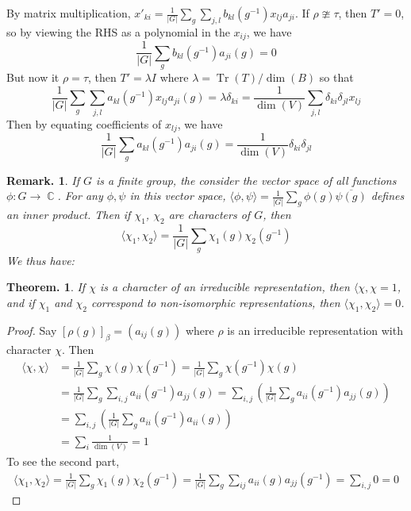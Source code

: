 \documentclass[11pt, a4paper]{memoir}
\DeclareMathOperator{\C}{{\mathbb{C}}}
\theoremstyle{change}
\newtheorem{theorem}{Theorem.}[section]
\theoremstyle{plain}
\theoremstyle{nonumberplain}
\newtheorem{remark}{Remark.}
\newtheorem{proof}{Proof}
\DeclareMathOperator{\Tr}{Tr}
\numberwithin{equation}{section}
\begin{document}
By matrix multiplication, $x'_{ki}=\frac{1}{|G|}\sum_g\sum_{j,l}b_{kl}(g^{-1})x_{lj}a_{ji}$.
If $\rho\ncong\tau$, then $T'=0$, so by viewing the RHS as a polynomial in the $x_{ij}$, we have
\begin{equation*}
    \frac{1}{|G|}\sum_g b_{kl}(g^{-1})a_{ji}(g)=0
\end{equation*}
But now it $\rho=\tau$, then $T'=\lambda I$ where $\lambda=\Tr(T)/\dim(B)$ so that
\begin{equation*}
    \frac{1}{|G|}\sum_g\sum_{j,l}a_{kl}(g^{-1})x_{lj}a_{ji}(g) = \lambda\delta_{ki}=\frac{1}{\dim(V)}\sum_{j,l}\delta_{ki}\delta_{jl}x_{lj}
\end{equation*}
Then by equating coefficients of $x_{lj}$, we have
\begin{equation*}
    \frac{1}{|G|}\sum_g a_{kl}(g^{-1})a_{ji}(g)=\frac{1}{\dim(V)}\delta_{ki}\delta_{jl}
\end{equation*}
\begin{remark}
    If $G$ is a finite group, the consider the vector space of all functions $\phi:G\to\C$.
    For any $\phi,\psi$ in this vector space, $\langle\phi,\psi\rangle=\frac{1}{|G|}\sum_g\phi(g)\overline{\psi(g)}$ defines an inner product.
    Then if $\chi_1$, $\chi_2$ are characters of $G$, then
    \begin{equation*}
        \langle\chi_1,\chi_2\rangle=\frac{1}{|G|}\sum_g\chi_1(g)\chi_2(g^{-1})
    \end{equation*}
    We thus have:
\end{remark}
\begin{theorem}
    If $\chi$ is a character of an irreducible representation, then $\langle{\chi,\chi}=1$, and if $\chi_1$ and $\chi_2$ correspond to non-isomorphic representations, then $\langle\chi_1,\chi_2\rangle=0$.
\end{theorem}
\begin{proof}
    Say $[\rho(g)]_\beta=(a_{ij}(g))$ where $\rho$ is an irreducible representation with character $\chi$.
    Then
    \begin{align*}
        \langle\chi,\chi\rangle &= \frac{1}{|G|}\sum_g\chi(g)\chi(g^{-1}) = \frac{1}{|G|}\sum_g\chi(g^{-1})\chi(g)\\
                                &= \frac{1}{|G|}\sum_g\sum_{i,j}a_{ii}(g^{-1})a_{jj}(g) = \sum_{i,j}\left(\frac{1}{|G|}\sum_g a_{ii}(g^{-1})a_{jj}(g)\right)\\
                                &= \sum_{i,j}\left(\frac{1}{|G|}\sum_g a_{ii}(g^{-1})a_{ii}(g)\right)\\
                                &= \sum_i\frac{1}{\dim(V)} = 1
    \end{align*}
    To see the second part,
    \begin{align*}
        \langle\chi_1,\chi_2\rangle = \frac{1}{|G|}\sum_g\chi_1(g)\chi_2(g^{-1}) = \frac{1}{|G|}\sum_g\sum_{ij} a_{ii}(g)a_{jj}(g^{-1}) = \sum_{i,j}0=0
    \end{align*}
\end{proof}
\end{document}
